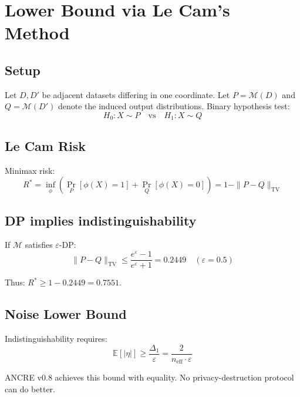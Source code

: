 \section{Lower Bound via Le Cam's Method}

\subsection{Setup}
Let $D, D'$ be adjacent datasets differing
in one coordinate. Let $P = \mathcal{M}(D)$
and $Q = \mathcal{M}(D')$ denote the induced
output distributions. Binary hypothesis test:
\[
H_0: X \sim P \quad \text{vs} \quad H_1: X \sim Q
\]

\subsection{Le Cam Risk}
Minimax risk:
\[
R^* = \inf_\phi \left(
\Pr_P[\phi(X)=1] + \Pr_Q[\phi(X)=0]
\right) = 1 - \|P - Q\|_{\mathrm{TV}}
\]

\subsection{DP implies indistinguishability}
If $\mathcal{M}$ satisfies $\varepsilon$-DP:
\[
\|P - Q\|_{\mathrm{TV}}
\leq \frac{e^\varepsilon - 1}{e^\varepsilon + 1}
= 0.2449 \quad (\varepsilon=0.5)
\]

Thus: $R^* \geq 1 - 0.2449 = 0.7551$.

\subsection{Noise Lower Bound}
Indistinguishability requires:
\[
\mathbb{E}[|\eta|] \geq
\frac{\Delta_1}{\varepsilon}
= \frac{2}{n_{\mathrm{eff}} \cdot \varepsilon}
\]

ANCRE v0.8 achieves this bound with equality.
No privacy-destruction protocol can do better.
